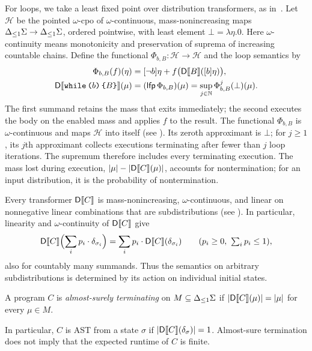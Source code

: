 For loops, we take a least fixed point over distribution transformers,
as in~\cite{zilken2026verifyingsamplingalgorithmsdistributional}.
Let $\mathcal H$ be the pointed $\omega$-cpo of $\omega$-continuous,
mass-nonincreasing maps ${\Delta_{\leq 1} \Sigma}\to{\Delta_{\leq 1}\Sigma}$, ordered pointwise,
with least element $\bot=\lambda\eta.0$.
Here $\omega$-continuity means monotonicity and preservation of suprema
of increasing countable chains. Define the functional
$\Phi_{b,B}:\mathcal H\to\mathcal H$ and the loop semantics by
\begin{equation}
 \begin{aligned}
 \Phi_{b,B}(f)(\eta)&=[\neg b]\eta+f\bigl(\mathsf{D}\llbracket B\rrbracket([b]\eta)\bigr),\\
 \mathsf{D}\llbracket \textnormal{\texttt{while}}\,\textnormal{\texttt{(}} b\textnormal{\texttt{)}}\,\textnormal{\texttt{\{}} B\textnormal{\texttt{\}}}\rrbracket(\mu)
   &=(\mathsf{lfp\,}\Phi_{b,B})(\mu)
     =\sup_{j\in\mathbb N}\Phi_{b,B}^j(\bot)(\mu).
 \end{aligned}
 \label{eq:while-transformer-fixpoint}
\end{equation}
The first summand retains the mass that exits immediately; the second
executes the body on the enabled mass and applies $f$ to the result.
The functional $\Phi_{b,B}$ is $\omega$-continuous and maps
$\mathcal H$ into itself (see ).
Its zeroth approximant is $\bot$; for $j\geq1$, its $j$th approximant
collects executions terminating after fewer than $j$ loop iterations.
The supremum therefore includes every terminating execution.
The mass lost during execution,
$|\mu|-|\mathsf{D}\llbracket C\rrbracket(\mu)|$, accounts for nontermination;
for an input distribution, it is the probability of nontermination.

Every transformer $\mathsf{D}\llbracket C\rrbracket$ is mass-nonincreasing, $\omega$-continuous,
and linear on nonnegative linear combinations that are subdistributions
(see ). In particular, linearity and
$\omega$-continuity of $\mathsf{D}\llbracket C\rrbracket$ give
\[
 \mathsf{D}\llbracket C\rrbracket\Bigl(\sum_i p_i \cdot \delta_{\sigma_i}\Bigr)
   =\sum_i p_i \cdot \mathsf{D}\llbracket C\rrbracket(\delta_{\sigma_i})
 \qquad(p_i\geq0,\ \textstyle\sum_i p_i\leq1),
\]
also for countably many summands. Thus the semantics on arbitrary
subdistributions is determined by its action on individual initial states.

\begin{definition}
A program $C$ is \emph{almost-surely terminating} on
$M\subseteq{\Delta_{\leq 1}\Sigma}$ if
$|\mathsf{D}\llbracket C\rrbracket(\mu)|=|\mu|$ for every $\mu\in M$.
\end{definition}
In particular, $C$ is AST from a state $\sigma$ if
$|\mathsf{D}\llbracket C\rrbracket(\delta_{\sigma})|=1$.
Almost-sure termination does not imply that the expected runtime of $C$
is finite.

